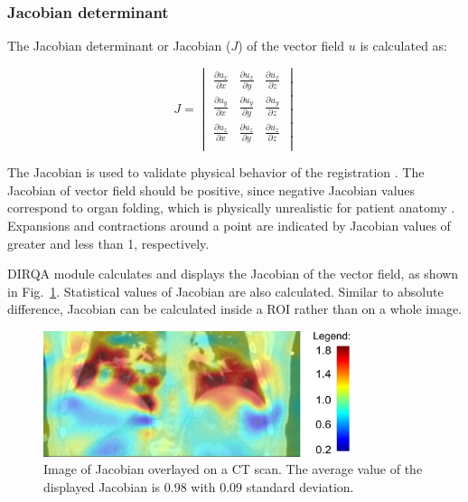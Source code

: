 \newpage
\subsubsection{Jacobian determinant}
\label{Jacobian}

The Jacobian determinant or Jacobian ($J$) of the vector field $u$ is calculated as:



\begin{equation}
J = \begin{vmatrix} 
\frac{\partial u_x}{\partial x} & \frac{\partial u_x}{\partial y} & \frac{\partial u_x}{\partial z} \\
\frac{\partial u_y}{\partial x} & \frac{\partial u_y}{\partial y} & \frac{\partial u_y}{\partial z} \\
\frac{\partial u_z}{\partial x} & \frac{\partial u_z}{\partial y} & \frac{\partial u_z}{\partial z} \\
\end{vmatrix}
\end{equation}

The Jacobian is used to validate physical behavior of the registration \cite{Leow2007}. 
The Jacobian of vector field should be positive, since negative Jacobian values correspond to organ folding, 
which is physically unrealistic for patient anatomy \cite{ Rey2002, Chen2008}. 
Expansions and contractions around a point are indicated by Jacobian values of greater and less than 1, respectively.

DIRQA module calculates and displays the Jacobian of the vector field, as shown in Fig.~\ref{JacobianImage}. Statistical values of Jacobian are also calculated. Similar to absolute difference, Jacobian can be calculated inside a ROI rather than on a whole image.

\begin{figure}[H]
	\begin{center}		
		\includegraphics[width=0.8\textwidth]{./VisualMotionManagment/Images/jacobian.png}
		\caption{Image of Jacobian overlayed on a CT scan. The average value of the displayed Jacobian is 0.98 with 0.09 standard deviation.}
		\label{JacobianImage}
	\end{center}
\end{figure}

